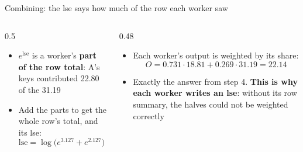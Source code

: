 \documentclass[aspectratio=169,11pt]{beamer}
\begin{document}
\begin{frame}{Combining: the lse says how much of the row each worker saw}
\centering
{}
\vspace{2mm}
\begin{columns}[T]
\begin{column}{0.5\textwidth}
\small
\begin{itemize}
\item $e^{\mathrm{lse}}$ is a worker's \textbf{part of the row total}: A's keys contributed 22.80 of the 31.19
\item Add the parts to get the whole row's total, and its lse:
\[ \mathrm{lse} = \log\bigl(e^{3.127}+e^{2.127}\bigr) = 3.440 \]
\end{itemize}
\end{column}
\begin{column}{0.48\textwidth}
\small
\begin{itemize}
\item Each worker's output is weighted by its share:
\[ O = 0.731\cdot18.81 + 0.269\cdot31.19 = \mathbf{22.14} \]
\item Exactly the answer from step 4. \textbf{This is why each worker writes an lse}: without its row summary, the halves could not be weighted correctly
\end{itemize}
\end{column}
\end{columns}
\end{frame}
\end{document}
